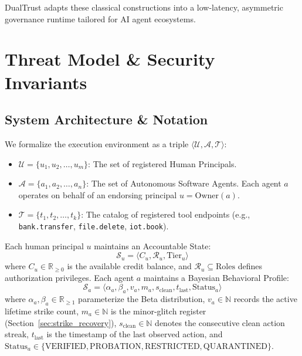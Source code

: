 \documentclass[journal]{IEEEtran}
\begin{document}
DualTrust adapts these classical constructions into a low-latency, asymmetric governance runtime tailored for AI agent ecosystems.

\section{Threat Model \& Security Invariants}
\label{sec:threat_model}

\subsection{System Architecture \& Notation}
We formalize the execution environment as a triple $\langle \mathcal{U}, \mathcal{A}, \mathcal{T} \rangle$:
\begin{itemize}[leftmargin=12pt, topsep=2pt, itemsep=1pt]
\item $\mathcal{U} = \{u_1, u_2, \dots, u_m\}$: The set of registered Human Principals.
\item $\mathcal{A} = \{a_1, a_2, \dots, a_n\}$: The set of Autonomous Software Agents. Each agent $a$ operates on behalf of an endorsing principal $u = \text{Owner}(a)$.
\item $\mathcal{T} = \{t_1, t_2, \dots, t_k\}$: The catalog of registered tool endpoints (e.g., \texttt{bank.transfer}, \texttt{file.delete}, \texttt{iot.book}).
\end{itemize}

Each human principal $u$ maintains an Accountable State:
\begin{equation}
\mathcal{S}_u = \langle C_u, \mathcal{R}_u, \text{Tier}_u \rangle
\end{equation}
where $C_u \in \mathbb{R}_{\ge 0}$ is the available credit balance, and $\mathcal{R}_u \subseteq \text{Roles}$ defines authorization privileges. Each agent $a$ maintains a Bayesian Behavioral Profile:
\begin{equation}
\mathcal{S}_a = \langle \alpha_a, \beta_a, v_a, m_a, s_{\text{clean}}, t_{\text{last}}, \text{Status}_a \rangle
\end{equation}
where $\alpha_a, \beta_a \in \mathbb{R}_{\ge 1}$ parameterize the Beta distribution, $v_a \in \mathbb{N}$ records the active lifetime strike count, $m_a \in \mathbb{N}$ is the minor-glitch register (Section~\ref{sec:strike_recovery}), $s_{\text{clean}} \in \mathbb{N}$ denotes the consecutive clean action streak, $t_{\text{last}}$ is the timestamp of the last observed action, and $\text{Status}_a \in \{\text{VERIFIED}, \text{PROBATION}, \text{RESTRICTED}, \text{QUARANTINED}\}$.
\end{document}
